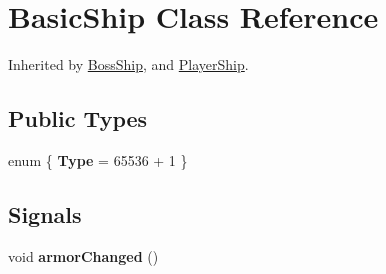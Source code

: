 \hypertarget{class_basic_ship}{
\section{BasicShip Class Reference}
\label{class_basic_ship}
}


Inherited by \hyperlink{class_boss_ship}{BossShip}, and \hyperlink{class_player_ship}{PlayerShip}.\subsection*{Public Types}
\begin{DoxyCompactItemize}
\item 
enum \{ {\bfseries Type} =  65536 + 1
 \}
\end{DoxyCompactItemize}
\subsection*{Signals}
\begin{DoxyCompactItemize}
\item 
\hypertarget{class_basic_ship_a88b2200dd98dd629d9c7fc9d056c93e6}{
void {\bfseries armorChanged} ()}
\label{class_basic_ship_a88b2200dd98dd629d9c7fc9d056c93e6}

\end{DoxyCompactItemize}
